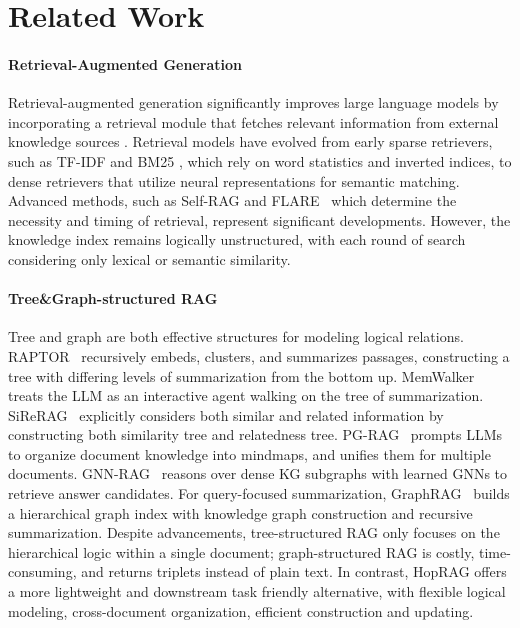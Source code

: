 \section{Related Work} 
\label{sec:RelatedWork}
\paragraph{Retrieval-Augmented Generation}
Retrieval-augmented generation significantly improves large language models by incorporating a retrieval module that fetches relevant information from external knowledge sources \citep{EaE, REALM, FID, survey, yu2025mramg}. Retrieval models have evolved from early sparse retrievers, such as TF-IDF \citep{TF-IDF} and BM25 \citep{BM25}, which rely on word statistics and inverted indices, to dense retrievers \citep{2020RAG} that utilize neural representations for semantic matching. Advanced methods, such as Self-RAG \citep{Self-RAG} and FLARE~\citep{FLARE} which determine the necessity and timing of retrieval, represent significant developments. However, the knowledge index remains logically unstructured, with each round of search considering only lexical or semantic similarity.




\paragraph{Tree\&Graph-structured RAG}
Tree and graph are both effective structures for modeling logical relations. RAPTOR~\citep{RAPTOR} recursively embeds, clusters, and summarizes passages, constructing a tree with differing levels of summarization from the bottom up.
MemWalker~\citep{chen_walking_2023} treats the LLM as an interactive agent walking on the tree of summarization. SiReRAG~\citep{zhang2024sireragindexingsimilarrelated} explicitly considers both similar and related information by constructing both similarity tree and relatedness tree. 
PG-RAG~\citep{PG-RAG} prompts LLMs to organize document knowledge into mindmaps, and unifies them for multiple documents. 
GNN-RAG~\citep{GNN-RAG} reasons over dense KG subgraphs with learned GNNs to retrieve answer candidates.
For query-focused summarization, GraphRAG~\citep{GraphRAG} builds a hierarchical graph index with knowledge graph construction and recursive summarization. 
Despite advancements, tree-structured RAG only focuses on the hierarchical logic within a single document; graph-structured RAG is costly, time-consuming, and returns triplets instead of plain text. 
In contrast, HopRAG offers a more lightweight and downstream task friendly alternative, with flexible logical modeling, cross-document organization, efficient construction and updating.


